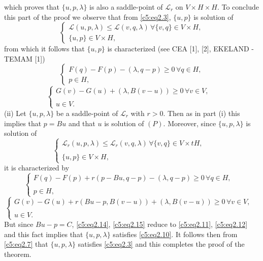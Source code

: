 which proves that $\{u, p, \lambda \}$ is also a saddle-point of $\mathscr{L}_r$ on $V \times H \times H$. To conclude this part of the proof we observe that from \eqref{c5:eq2.3}, $\{u, p \}$ is solution of 
\begin{equation}
\begin{cases}
\mathscr{L} (u, p, \lambda) \leq \mathscr{L}(v, q, \lambda)\, \forall \{v, q \} \in V \times H,\\
\{u, p\} \in V \times H, \tag{2.10}\label{c5:eq2.10}
\end{cases}
\end{equation}
from which it follows that $\{u, p \}$ is characterized (see CEA [1], [2], EKELAND - TEMAM [1])
\begin{equation}
\begin{cases}
F (q) - F (p) - (\lambda, q-p) \geq 0\, \forall q \in H,\\
p \in H, \tag{2.11}\label{c5:eq2.11}
\end{cases}
\end{equation}
\begin{equation}
\begin{cases}
G (v) - G (u) + (\lambda, B(v-u)) \geq 0\, \forall v \in V, \\
& \\
u \in V. \tag{2.12}\label{c5:eq2.12}
\end{cases}
\end{equation}\pageoriginale 
(ii) Let $\{u, p, \lambda \}$ be a saddle-point of $\mathscr{L}_r$ with $r > 0$. Then as in part (i) this implies that $p = Bu$ and that $u$ is  solution of $(P)$. Moreover, since $\{u, p, \lambda \}$ is solution of 
\begin{equation}
\begin{cases}
\mathscr{L}_r (u, p, \lambda) \leq \mathscr{L}_r (v, q, \lambda)\, \forall \{v, q \} \in V \times tH, \\
& \\
\{u, p \} \in V \times H,\tag{2.13}\label{c5:eq2.13}
\end{cases}
\end{equation}
it is characterized by 
\begin{equation}
\begin{cases}
F (q) - F (p)+ r (p-Bu, q-p)- (\lambda, q-p)\geq 0\, \forall q \in H, \\
& \\
p \in H,\tag{2.14}\label{c5:eq2.14} 
\end{cases}
\end{equation}
\begin{equation}
\begin{cases}
G (v) - G(u) + r (Bu-p, B (v-u)) + (\lambda, B(v-u)) \geq 0\, \forall v  \in V, \\
& \\
u \in V. \tag{2.15}\label{c5:eq2.15}
\end{cases}
\end{equation}
But since $Bu - p = C$,  \eqref{c5:eq2.14}, \eqref{c5:eq2.15} reduce
to \eqref{c5:eq2.11}, \eqref{c5:eq2.12} and this fact implies that
$\{u, p, \lambda \}$ satisfies \eqref{c5:eq2.10}. It follows then from
\eqref{c5:eq2.7} that $\{u, p, \lambda \}$ satisfies \eqref{c5:eq2.3}
and this completes the proof of the theorem. 


